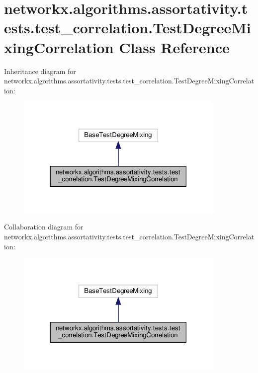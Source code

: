 \hypertarget{classnetworkx_1_1algorithms_1_1assortativity_1_1tests_1_1test__correlation_1_1TestDegreeMixingCorrelation}{}\section{networkx.\+algorithms.\+assortativity.\+tests.\+test\+\_\+correlation.\+Test\+Degree\+Mixing\+Correlation Class Reference}
\label{classnetworkx_1_1algorithms_1_1assortativity_1_1tests_1_1test__correlation_1_1TestDegreeMixingCorrelation}


Inheritance diagram for networkx.\+algorithms.\+assortativity.\+tests.\+test\+\_\+correlation.\+Test\+Degree\+Mixing\+Correlation\+:
\nopagebreak
\begin{figure}[H]
\begin{center}
\leavevmode
\includegraphics[width=285pt]{classnetworkx_1_1algorithms_1_1assortativity_1_1tests_1_1test__correlation_1_1TestDegreeMixingCorrelation__inherit__graph}
\end{center}
\end{figure}


Collaboration diagram for networkx.\+algorithms.\+assortativity.\+tests.\+test\+\_\+correlation.\+Test\+Degree\+Mixing\+Correlation\+:
\nopagebreak
\begin{figure}[H]
\begin{center}
\leavevmode
\includegraphics[width=285pt]{classnetworkx_1_1algorithms_1_1assortativity_1_1tests_1_1test__correlation_1_1TestDegreeMixingCorrelation__coll__graph}
\end{center}
\end{figure}
